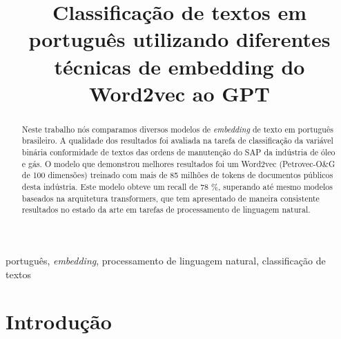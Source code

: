 \documentclass[conference]{IEEEtran}
\begin{document}
\title{Classificação de textos em português utilizando diferentes técnicas de embedding do Word2vec ao GPT\\
}

\author{
\and
{}
}

\maketitle

\begin{abstract}
Neste trabalho nós comparamos diversos modelos de \textit{embedding} de texto em português brasileiro. A qualidade dos resultados foi avaliada na tarefa de classificação da variável binária conformidade de textos das ordens de manutenção do SAP da indústria de óleo e gás. O modelo que demonstrou melhores resultados foi um Word2vec (Petrovec-O\&G de 100 dimensões) treinado com mais de 85 milhões de tokens de documentos públicos desta indústria. Este modelo obteve um recall de 78 \%, superando até mesmo modelos baseados na arquitetura transformers, que tem apresentado de maneira consistente resultados no estado da arte em tarefas de processamento de linguagem natural.
\end{abstract}

\begin{IEEEkeywords}
português, \textit{embedding}, processamento de linguagem natural, classificação de textos
\end{IEEEkeywords}

\section{Introdução}
\end{document}
